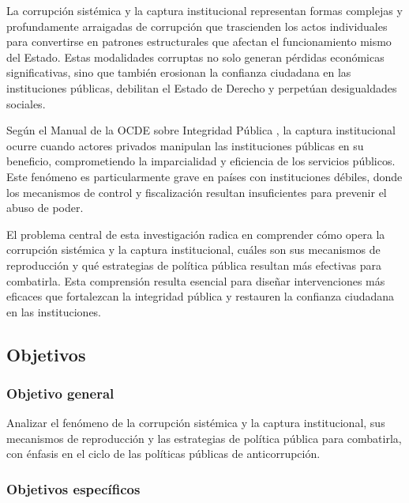 \documentclass[12pt,a4paper]{article}
\begin{document}
La corrupción sistémica y la captura institucional representan formas complejas y profundamente arraigadas de corrupción que trascienden los actos individuales para convertirse en patrones estructurales que afectan el funcionamiento mismo del Estado. Estas modalidades corruptas no solo generan pérdidas económicas significativas, sino que también erosionan la confianza ciudadana en las instituciones públicas, debilitan el Estado de Derecho y perpetúan desigualdades sociales.

Según el Manual de la OCDE sobre Integridad Pública \parencite{ocde2020}, la captura institucional ocurre cuando actores privados manipulan las instituciones públicas en su beneficio, comprometiendo la imparcialidad y eficiencia de los servicios públicos. Este fenómeno es particularmente grave en países con instituciones débiles, donde los mecanismos de control y fiscalización resultan insuficientes para prevenir el abuso de poder.

El problema central de esta investigación radica en comprender cómo opera la corrupción sistémica y la captura institucional, cuáles son sus mecanismos de reproducción y qué estrategias de política pública resultan más efectivas para combatirla. Esta comprensión resulta esencial para diseñar intervenciones más eficaces que fortalezcan la integridad pública y restauren la confianza ciudadana en las instituciones.

\subsection{Objetivos}

\subsubsection{Objetivo general}

Analizar el fenómeno de la corrupción sistémica y la captura institucional, sus mecanismos de reproducción y las estrategias de política pública para combatirla, con énfasis en el ciclo de las políticas públicas de anticorrupción.

\subsubsection{Objetivos específicos}
\end{document}
